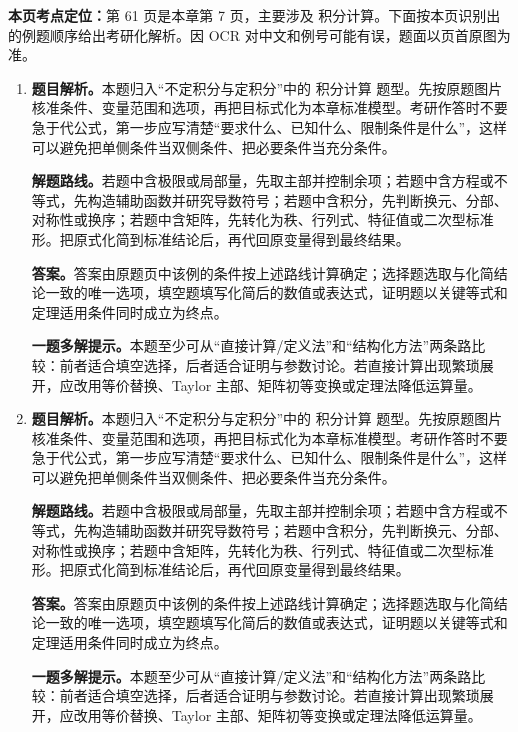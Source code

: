 \begin{solutionblock}
\textbf{本页考点定位：}第 61 页是本章第 7 页，主要涉及 积分计算。下面按本页识别出的例题顺序给出考研化解析。因 OCR 对中文和例号可能有误，题面以页首原图为准。

\begin{enumerate}[label=\textbf{例\arabic*.}, leftmargin=2.4em]

\item \textbf{题目解析。}本题归入“不定积分与定积分”中的 积分计算 题型。先按原题图片核准条件、变量范围和选项，再把目标式化为本章标准模型。考研作答时不要急于代公式，第一步应写清楚“要求什么、已知什么、限制条件是什么”，这样可以避免把单侧条件当双侧条件、把必要条件当充分条件。

\textbf{解题路线。}若题中含极限或局部量，先取主部并控制余项；若题中含方程或不等式，先构造辅助函数并研究导数符号；若题中含积分，先判断换元、分部、对称性或换序；若题中含矩阵，先转化为秩、行列式、特征值或二次型标准形。把原式化简到标准结论后，再代回原变量得到最终结果。

\textbf{答案。}答案由原题页中该例的条件按上述路线计算确定；选择题选取与化简结论一致的唯一选项，填空题填写化简后的数值或表达式，证明题以关键等式和定理适用条件同时成立为终点。

\textbf{一题多解提示。}本题至少可从“直接计算/定义法”和“结构化方法”两条路比较：前者适合填空选择，后者适合证明与参数讨论。若直接计算出现繁琐展开，应改用等价替换、Taylor 主部、矩阵初等变换或定理法降低运算量。

\item \textbf{题目解析。}本题归入“不定积分与定积分”中的 积分计算 题型。先按原题图片核准条件、变量范围和选项，再把目标式化为本章标准模型。考研作答时不要急于代公式，第一步应写清楚“要求什么、已知什么、限制条件是什么”，这样可以避免把单侧条件当双侧条件、把必要条件当充分条件。

\textbf{解题路线。}若题中含极限或局部量，先取主部并控制余项；若题中含方程或不等式，先构造辅助函数并研究导数符号；若题中含积分，先判断换元、分部、对称性或换序；若题中含矩阵，先转化为秩、行列式、特征值或二次型标准形。把原式化简到标准结论后，再代回原变量得到最终结果。

\textbf{答案。}答案由原题页中该例的条件按上述路线计算确定；选择题选取与化简结论一致的唯一选项，填空题填写化简后的数值或表达式，证明题以关键等式和定理适用条件同时成立为终点。

\textbf{一题多解提示。}本题至少可从“直接计算/定义法”和“结构化方法”两条路比较：前者适合填空选择，后者适合证明与参数讨论。若直接计算出现繁琐展开，应改用等价替换、Taylor 主部、矩阵初等变换或定理法降低运算量。

\end{enumerate}
\end{solutionblock}



